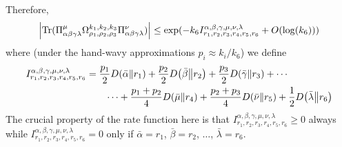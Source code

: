 \documentclass[notitlepage]{article}
\begin{document}
Therefore,
\begin{equation}
    \label{eq:sextuple_total_upper_bound}
    \left|\operatorname{Tr}(\Pi^{\mu}_{\alpha\beta\gamma\lambda} \Omega_{\rho_1,\rho_2,\rho_3}^{k_1, k_2, k_3} \Pi^{\nu}_{\alpha\beta\gamma\lambda})\right| \leq \exp( - k_6 I_{r_1, r_2, r_3, r_4, r_5, r_6}^{\alpha, \beta, \gamma, \mu, \nu, \lambda} + O(\log(k_6)))
\end{equation}
where (under the hand-wavy approximations $p_i \approx k_i/k_6$) we define
\begin{align}
    \begin{split}
        I_{r_1, r_2, r_3, r_4, r_5, r_6}^{\alpha, \beta, \gamma, \mu, \nu, \lambda}
        &= \frac{p_1}{2}D\!\left(\bar \alpha\middle\|r_1\right)+\frac{p_2}{2}D\!\left(\bar \beta\middle\|r_2\right)+\frac{p_3}{2}D\!\left(\bar \gamma\middle\|r_3\right)+\cdots \\
        &\qquad \cdots +\frac{p_1+p_2}{4}D\!\left(\bar \mu\middle\|r_4\right)+\frac{p_2+p_3}{4}D\!\left(\bar \nu\middle\|r_5\right)+\frac{1}{2}D\!\left(\bar \lambda\middle\|r_6\right)
    \end{split}
\end{align}
The crucial property of the rate function here is that $I_{r_1, r_2, r_3, r_4, r_5, r_6}^{\alpha, \beta, \gamma, \mu, \nu, \lambda} \geq 0$ always while $I_{r_1, r_2, r_3, r_4, r_5, r_6}^{\alpha, \beta, \gamma, \mu, \nu, \lambda} = 0$ only if $\bar \alpha = r_1$, $\bar \beta = r_2$, $\ldots$, $\bar \lambda = r_6$.
\end{document}
